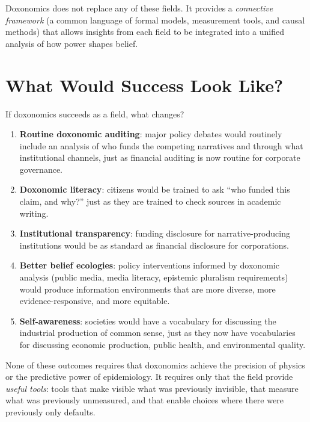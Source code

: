 Doxonomics does not replace any of these fields.
It provides a \emph{connective framework} (a common language of formal models, measurement tools, and causal methods) that allows insights from each field to be integrated into a unified analysis of how power shapes belief.

\section{What Would Success Look Like?}
\label{sec:ch35-success}

If doxonomics succeeds as a field, what changes?

\begin{enumerate}
  \item \textbf{Routine doxonomic auditing}: major policy debates would routinely include an analysis of who funds the competing narratives and through what institutional channels, just as financial auditing is now routine for corporate governance.

  \item \textbf{Doxonomic literacy}: citizens would be trained to ask ``who funded this claim, and why?'' just as they are trained to check sources in academic writing.

  \item \textbf{Institutional transparency}: funding disclosure for narrative-producing institutions would be as standard as financial disclosure for corporations.

  \item \textbf{Better belief ecologies}: policy interventions informed by doxonomic analysis (public media, media literacy, epistemic pluralism requirements) would produce information environments that are more diverse, more evidence-responsive, and more equitable.

  \item \textbf{Self-awareness}: societies would have a vocabulary for discussing the industrial production of common sense, just as they now have vocabularies for discussing economic production, public health, and environmental quality.
\end{enumerate}

None of these outcomes requires that doxonomics achieve the precision of physics or the predictive power of epidemiology.
It requires only that the field provide \emph{useful tools}: tools that make visible what was previously invisible, that measure what was previously unmeasured, and that enable choices where there were previously only defaults.

